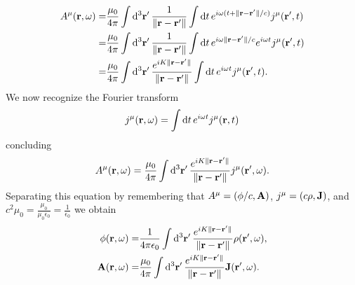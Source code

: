 \documentclass{article}
\begin{document}
\begin{enumerate}[(i)]
\begin{align}
\begin{split}
A^\mu(\vb{r},\omega)=&\frac{\mu_0}{4\pi}\int \dd[3]{\vb{r}'}\frac{1}{\|\vb{r}-\vb{r}'\|}\int\dd{t}e^{i\omega(t+\|\vb{r}-\vb{r}'\|/c)}j^\mu(\vb{r}',t)\\
=&\frac{\mu_0}{4\pi}\int \dd[3]{\vb{r}'}\frac{1}{\|\vb{r}-\vb{r}'\|}\int\dd{t}e^{i\omega\|\vb{r}-\vb{r}'\|/c}e^{i\omega t}j^\mu(\vb{r}',t)\\
=&\frac{\mu_0}{4\pi}\int \dd[3]{\vb{r}'}\frac{e^{iK\|\vb{r}-\vb{r}'\|}}{\|\vb{r}-\vb{r}'\|}\int\dd{t}e^{i\omega t}j^\mu(\vb{r}',t).
\end{split}
\end{align}
We now recognize the Fourier transform
\begin{equation}\label{ec:fourier_current}
j^\mu(\vb{r},\omega)=\int\dd{t}e^{i\omega t}j^\mu(\vb{r},t)
\end{equation}
concluding
\begin{equation}
A^\mu(\vb{r},\omega)=\frac{\mu_0}{4\pi}\int \dd[3]{\vb{r}'}\frac{e^{iK\|\vb{r}-\vb{r}'\|}}{\|\vb{r}-\vb{r}'\|}j^\mu(\vb{r}',\omega).
\end{equation}
Separating this equation by remembering that $A^\mu=(\phi/c,\vb{A})$, $j^\mu=(c\rho,\vb{J})$, and $c^2\mu_0=\frac{\mu_0}{\mu_0\epsilon_0}=\frac{1}{\epsilon_0}$ we obtain
\begin{align}\label{ec:fourier_vector_potential}
\begin{split}
\phi(\vb{r},\omega)=&\frac{1}{4\pi\epsilon_0}\int \dd[3]{\vb{r}'}\frac{e^{iK\|\vb{r}-\vb{r}'\|}}{\|\vb{r}-\vb{r}'\|}\rho(\vb{r}',\omega),\\
\vb{A}(\vb{r},\omega)=&\frac{\mu_0}{4\pi}\int \dd[3]{\vb{r}'}\frac{e^{iK\|\vb{r}-\vb{r}'\|}}{\|\vb{r}-\vb{r}'\|}\vb{J}(\vb{r}',\omega).
\end{split}
\end{align}


\end{enumerate}
\end{document}
